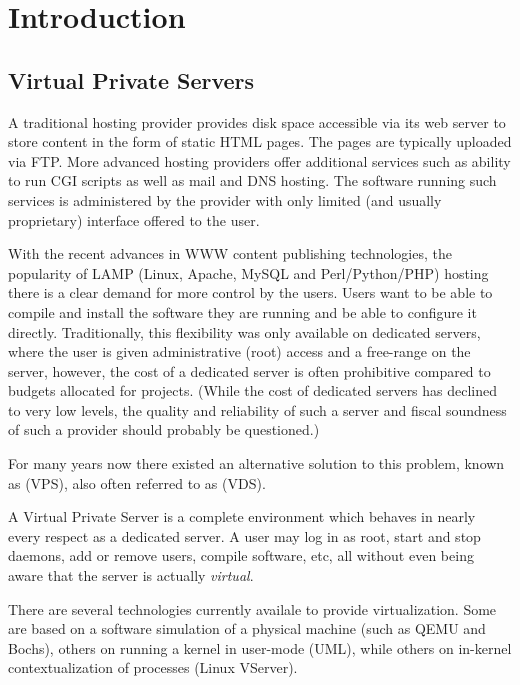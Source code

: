 \chapter{Introduction\label{introduction}}

\section{Virtual Private Servers\label{intr-vservers}}

A traditional hosting provider provides disk space accessible via its
web server to store content in the form of static HTML pages. The
pages are typically uploaded via FTP. More advanced hosting providers
offer additional services such as ability to run CGI scripts as well
as mail and DNS hosting. The software running such services is
administered by the provider with only limited (and usually
proprietary) interface offered to the user.

With the recent advances in WWW content publishing technologies, the
popularity of LAMP (Linux, Apache, MySQL and Perl/Python/PHP) hosting
there is a clear demand for more control by the users. Users want to
be able to compile and install the software they are running and be
able to configure it directly. Traditionally, this flexibility was
only available on dedicated servers, where the user is given
administrative (root) access and a free-range on the server, however,
the cost of a dedicated server is often prohibitive compared to
budgets allocated for projects. (While the cost of dedicated servers
has declined to very low levels, the quality and reliability of such a
server and fiscal soundness of such a provider should probably be
questioned.)

For many years now there existed an alternative solution to this
problem, known as  (VPS), also often
referred to as  (VDS).

A Virtual Private Server is a complete environment which behaves in
nearly every respect as a dedicated server. A user may log in as root,
start and stop daemons, add or remove users, compile software, etc,
all without even being aware that the server is actually
\emph{virtual}.

There are several technologies currently availale to provide
virtualization. Some are based on a software simulation of a physical
machine (such as QEMU and Bochs), others on running a kernel in
user-mode (UML), while others on in-kernel contextualization of
processes (Linux VServer). 

